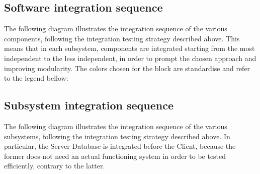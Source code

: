 \subsection{Software integration sequence}
The following diagram illustrates the integration sequence of the various components, following the integration testing strategy described above. This means that in each subsystem, components are integrated starting from the most independent to the less independent, in order to prompt the chosen approach and improving modularity. The colors chosen for the block are standardise and refer to the legend bellow:
\begin{itemize}
\end{itemize}

\subsection{Subsystem integration sequence}
The following diagram illustrates the integration sequence of the various subsystems, following the integration testing strategy described above. In particular, the Server Database is integrated before the Client, because the former does not need an actual functioning system in order to be tested efficiently, contrary to the latter.
